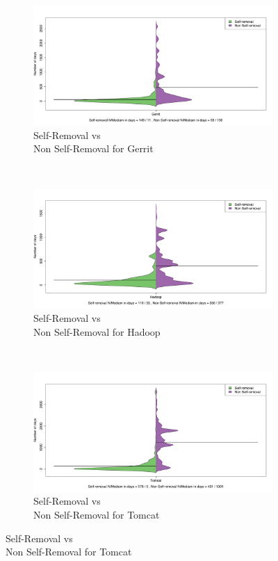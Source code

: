 \begin{figure}[t]
	\centering
	\begin{subfigure}[b]{0.33\textwidth}
		\includegraphics[width=\textwidth]{figures/gerrit_beanplot.pdf}
		\caption{Self-Removal vs \\ Non Self-Removal for Gerrit}
		\label{fig:removal_comparison_gerrit}
	\end{subfigure}
  ~
  ~
  ~
	\begin{subfigure}[b]{0.33\textwidth}
		\includegraphics[width=\textwidth]{figures/hadoop_beanplot.pdf}
		\caption{Self-Removal vs \\ Non Self-Removal for Hadoop}
		\label{fig:removal_comparison_hadoop}
	\end{subfigure}
  ~ 
  ~
  ~ 
	\begin{subfigure}[b]{0.33\textwidth}
		\includegraphics[width=\textwidth]{figures/tomcat_beanplot.pdf}
		\caption{Self-Removal vs \\ Non Self-Removal for Tomcat}
		\label{fig:removal_comparison_tomcat} 
	\end{subfigure}
\end{figure}




